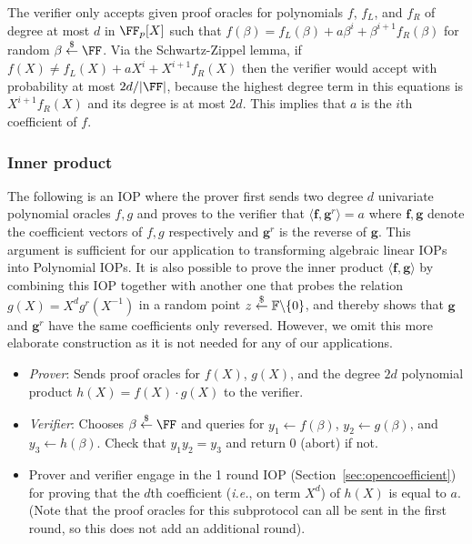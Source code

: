 The verifier only accepts given proof oracles for polynomials $f$, $f_L$, and $f_R$ of degree at most $d$ in $\FF_p[X]$ such that $f(\beta) = f_L(\beta) + a\beta^i + \beta^{i+1} f_R(\beta)$ for random $\beta \sample \FF$. Via the Schwartz-Zippel lemma, if $f(X) \neq f_L(X) + aX^i + X^{i+1}f_R(X)$ then the verifier would accept with probability at most $2d/|\FF|$, because the highest degree term in this equations is $X^{i+1} f_R(X)$ and its degree is at most $2d$. This implies that $a$ is the $i$th coefficient of $f$. %

 

\subsubsection{Inner product}\label{sec:innerproduct}
The following is an IOP where the prover first sends two degree $d$ univariate polynomial oracles $f, g$ and proves to the verifier that $\langle \mathbf{f}, \mathbf{g}^r \rangle = a$ where $\mathbf{f}, \mathbf{g}$ denote the coefficient vectors of $f, g$ respectively and $\mathbf{g}^r$ is the reverse of $\mathbf{g}$. This argument is sufficient for our application to transforming algebraic linear IOPs into Polynomial IOPs. It is also possible to prove the inner product $\langle \mathbf{f}, \mathbf{g} \rangle$ by combining this IOP together with another one that probes the relation $g(X) = X^dg^r(X^{-1})$ in a random point $z \overset{\$}{\gets} \mathbb{F} \backslash \{0\}$, and thereby shows that $\mathbf{g}$ and $\mathbf{g}^r$ have the same coefficients only reversed. However, we omit this more elaborate construction as it is not needed for any of our applications.

\begin{itemize}
\item \emph{Prover}: Sends proof oracles for $f(X)$, $g(X)$, and the degree $2d$ polynomial product $h(X) = f(X)\cdot g(X)$ to the verifier. 
\item \emph{Verifier}: Chooses $\beta \sample \FF$ and queries for $y_1 \leftarrow f(\beta)$, $y_2 \leftarrow g(\beta)$, and $y_3 \leftarrow h(\beta)$. Check that $y_1 y_2 = y_3$ and return $0$ (abort) if not.
\item Prover and verifier engage in the 1 round IOP (Section~\ref{sec:opencoefficient}) for proving that the $d$th coefficient (\emph{i.e.}, on term $X^d$) of $h(X)$ is equal to $a$. (Note that the proof oracles for this subprotocol can all be sent in the first round, so this does not add an additional round). %
\end{itemize}

